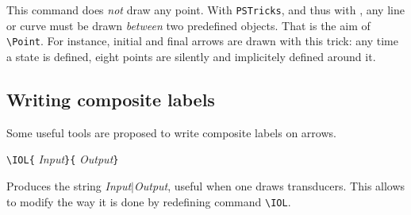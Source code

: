 \documentclass[11pt,twoside]{article}
\newlength{\ColoText}%
\newlength{\ColoFigu}%
\newlength{\parindenttemp} %
\newcommand{\noi}{\noindent}
\newlength{\jsIndent}%
\newcommand{\PSTricks}{\texttt{PSTricks}\xspace}
\begin{document}
This command does \textsl{not} draw any point.
With \PSTricks, and thus with \VCSG, any line or curve must be drawn
\textsl{between} two predefined objects. That is the aim of \verb+\Point+.
For instance, initial and final arrows are drawn with this trick:
any time a state is defined, eight points are silently and implicitely defined around it.

%   
%
%
%

\subsection{Writing composite labels}
Some useful tools are proposed to write composite labels on arrows.

\noi 
\hspace*{-\jsIndent}
\begin{minipage}[t]{\ColoText}
        \par\vspace*{0mm}%
        \footnotesize
\verb+\IOL{+%
   \textsl{Input}\verb+}{+%
   \textsl{Output}\verb+}+
\end{minipage}%
\hspace*{1.2em}%
\begin{minipage}[t]{\ColoFigu}%
\par\vspace*{0mm}%
Produces the string \textsl{Input}$\mid$\textsl{Output}, useful
when one draws transducers. This allows to modify the way it is done
by redefining command \verb+\IOL+.

\end{minipage}%
\end{document}
